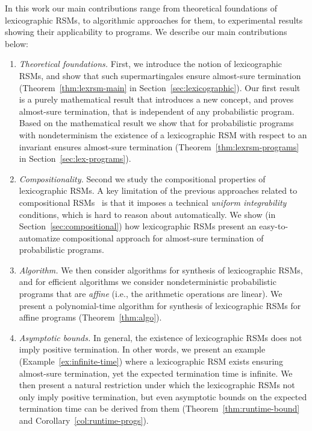 \smallskip{} 
In this work our main contributions range from theoretical foundations of lexicographic
RSMs, to algorithmic approaches for them, to experimental results
showing their applicability to programs.
We describe our main contributions below:
\begin{enumerate}

\item {\em Theoretical foundations.} 
First, we introduce the notion of lexicographic RSMs, and show that
such supermartingales ensure almost-sure termination (Theorem~\ref{thm:lexrsm-main} in 
Section~\ref{sec:lexicographic}). 
Our first result is a purely mathematical result that introduces a new concept, and 
proves almost-sure termination, that is independent of any probabilistic program.
Based on the mathematical result we show that for probabilistic programs with 
nondeterminism
the existence of a lexicographic RSM with respect to an invariant ensures
almost-sure termination (Theorem~\ref{thm:lexrsm-programs} in 
Section~\ref{sec:lex-programs}).

\item {\em Compositionality.} 
Second we study the compositional properties of lexicographic RSMs.
A key limitation of the previous approaches related to compositional 
RSMs~\cite{HolgerPOPL} is that it imposes a technical \emph{uniform 
integrability} conditions, which is hard to reason about automatically. We show 
(in Section~\ref{sec:compositional}) how 
lexicographic RSMs 
present an easy-to-automatize compositional approach for almost-sure 
termination of probabilistic programs.

\item {\em Algorithm.} We then consider algorithms for synthesis of lexicographic RSMs, 
and for efficient algorithms we consider nondeterministic probabilistic 
programs that are {\em affine} (i.e., the arithmetic operations are linear).
We present a polynomial-time algorithm for synthesis of lexicographic RSMs 
for affine programs (Theorem~\ref{thm:algo}).


\item {\em Asymptotic bounds.} 
In general, the existence of lexicographic RSMs does not imply positive
termination. 
In other words, we present an example (Example~\ref{ex:infinite-time}) where a 
lexicographic RSM exists ensuring
almost-sure termination, yet the expected termination time is infinite.
We then present a natural restriction under which the lexicographic 
RSMs not only imply positive termination, but even asymptotic bounds on the expected termination 
time can be derived from them (Theorem~\ref{thm:runtime-bound} and 
Corollary~\ref{col:runtime-progs}).



\end{enumerate}
